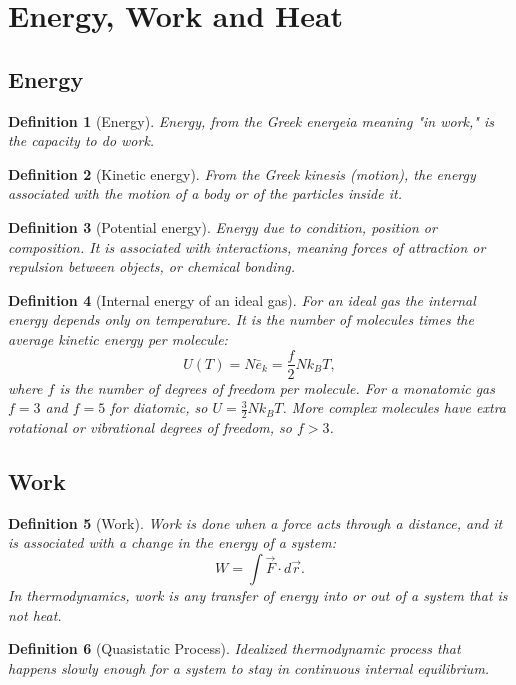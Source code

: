 \documentclass{article}
\newtheorem{definition}{Definition}
\begin{document}
\section{Energy, Work and Heat}

\subsection{Energy}
\begin{definition}[Energy]
    Energy, from the Greek \textit{energeia} meaning "in work," is the capacity to do work.
\end{definition}

\begin{definition}[Kinetic energy]
    From the Greek \textit{kinesis} (motion), the energy associated with the motion of a body or of the particles inside it.
\end{definition}

\begin{definition}[Potential energy]
    Energy due to condition, position or composition. It is associated with interactions, meaning forces of attraction or repulsion between objects, or chemical bonding.
\end{definition}

\begin{definition}[Internal energy of an ideal gas]
    For an ideal gas the internal energy depends only on temperature. It is the number of molecules times the average kinetic energy per molecule:
    \begin{equation}
        \label{eq:internal-energy}
        U(T) = N \bar{e}_k = \frac{f}{2} N k_B T,
    \end{equation}
    where $f$ is the number of degrees of freedom per molecule. For a monatomic gas $f = 3$ and $f = 5$ for diatomic, so $U = \tfrac{3}{2} N k_B T$. More complex molecules have extra rotational or vibrational degrees of freedom, so $f > 3$.
\end{definition}

\subsection{Work}
\begin{definition}[Work]
    Work is done when a force acts through a distance, and it is associated with a change in the energy of a system:
    \[W = \int \vec{F} \cdot d\vec{r}.\]
    In thermodynamics, work is any transfer of energy into or out of a system that is not heat.
\end{definition}
\begin{definition}[Quasistatic Process]
    Idealized thermodynamic process that happens slowly enough for a system to stay in continuous internal equilibrium.
\end{definition}
\end{document}

